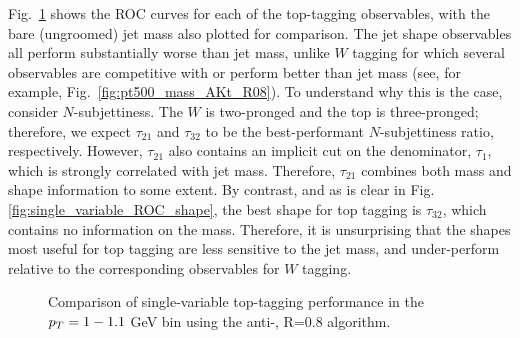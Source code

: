 Fig.~\ref{fig:single_variable_ROC} shows the ROC curves for each of the top-tagging observables, with the bare (ungroomed) jet mass also plotted for comparison. The jet shape observables all perform substantially worse than jet mass, unlike $W$ tagging for which several observables are competitive with or perform better than jet mass (see, for example, Fig.~\ref{fig:pt500_mass_AKt_R08}).
To understand why this is the case, consider $N$-subjettiness. The $W$ is two-pronged and the top is three-pronged; therefore, we expect $\tau_{21}$ and $\tau_{32}$ to be the best-performant $N$-subjettiness ratio, respectively. However, $\tau_{21}$ also contains an implicit cut on the denominator, $\tau_1$, which is strongly correlated with jet mass. Therefore, $\tau_{21}$ combines both mass and shape information to some extent. By contrast, and as is clear in Fig.\ref{fig:single_variable_ROC_shape}, the best shape for top tagging is $\tau_{32}$, which contains no information on the mass. Therefore, it is unsurprising that the  shapes most useful for top tagging are less sensitive to the jet mass, and under-perform relative to the corresponding observables for $W$ tagging.

\begin{figure}
\centering
{}
\caption{Comparison of single-variable top-tagging performance in the $p_T= 1-1.1$ GeV bin using the anti-\kT, R=0.8 algorithm.}
\label{fig:single_variable_ROC}
\end{figure}

